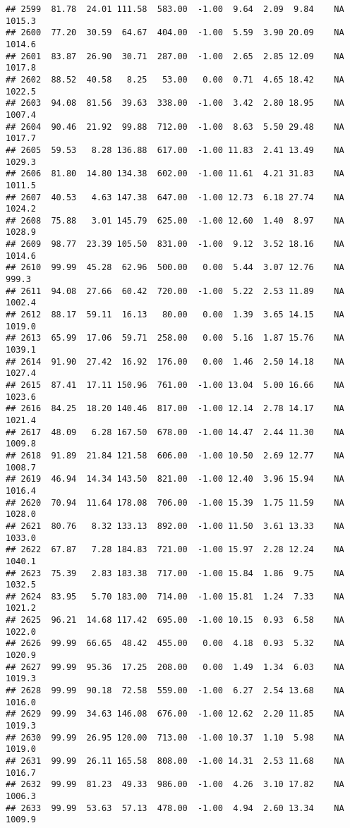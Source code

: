 \documentclass{article}\usepackage{graphicx, color}
\makeatletter
\newenvironment{kframe}{%
 \def\at@end@of@kframe{}%
 \ifinner\ifhmode%
  \def\at@end@of@kframe{\end{minipage}}%
  \begin{minipage}{\columnwidth}%
 \fi\fi%
 \def\FrameCommand##1{\hskip\@totalleftmargin \hskip-\fboxsep
 \colorbox{shadecolor}{##1}\hskip-\fboxsep
     \hskip-\linewidth \hskip-\@totalleftmargin \hskip\columnwidth}%
 \MakeFramed {\advance\hsize-\width
   \@totalleftmargin\z@ \linewidth\hsize
   \@setminipage}}%
 {\par\unskip\endMakeFramed%
 \at@end@of@kframe}
\newenvironment{knitrout}{}{} %
\makeatother
\begin{document}
\begin{knitrout}
\begin{kframe}
\begin{verbatim}
## 2599  81.78  24.01 111.58  583.00  -1.00  9.64  2.09  9.84    NA 1015.3
## 2600  77.20  30.59  64.67  404.00  -1.00  5.59  3.90 20.09    NA 1014.6
## 2601  83.87  26.90  30.71  287.00  -1.00  2.65  2.85 12.09    NA 1017.8
## 2602  88.52  40.58   8.25   53.00   0.00  0.71  4.65 18.42    NA 1022.5
## 2603  94.08  81.56  39.63  338.00  -1.00  3.42  2.80 18.95    NA 1007.4
## 2604  90.46  21.92  99.88  712.00  -1.00  8.63  5.50 29.48    NA 1017.7
## 2605  59.53   8.28 136.88  617.00  -1.00 11.83  2.41 13.49    NA 1029.3
## 2606  81.80  14.80 134.38  602.00  -1.00 11.61  4.21 31.83    NA 1011.5
## 2607  40.53   4.63 147.38  647.00  -1.00 12.73  6.18 27.74    NA 1024.2
## 2608  75.88   3.01 145.79  625.00  -1.00 12.60  1.40  8.97    NA 1028.9
## 2609  98.77  23.39 105.50  831.00  -1.00  9.12  3.52 18.16    NA 1014.6
## 2610  99.99  45.28  62.96  500.00   0.00  5.44  3.07 12.76    NA  999.3
## 2611  94.08  27.66  60.42  720.00  -1.00  5.22  2.53 11.89    NA 1002.4
## 2612  88.17  59.11  16.13   80.00   0.00  1.39  3.65 14.15    NA 1019.0
## 2613  65.99  17.06  59.71  258.00   0.00  5.16  1.87 15.76    NA 1039.1
## 2614  91.90  27.42  16.92  176.00   0.00  1.46  2.50 14.18    NA 1027.4
## 2615  87.41  17.11 150.96  761.00  -1.00 13.04  5.00 16.66    NA 1023.6
## 2616  84.25  18.20 140.46  817.00  -1.00 12.14  2.78 14.17    NA 1021.4
## 2617  48.09   6.28 167.50  678.00  -1.00 14.47  2.44 11.30    NA 1009.8
## 2618  91.89  21.84 121.58  606.00  -1.00 10.50  2.69 12.77    NA 1008.7
## 2619  46.94  14.34 143.50  821.00  -1.00 12.40  3.96 15.94    NA 1016.4
## 2620  70.94  11.64 178.08  706.00  -1.00 15.39  1.75 11.59    NA 1028.0
## 2621  80.76   8.32 133.13  892.00  -1.00 11.50  3.61 13.33    NA 1033.0
## 2622  67.87   7.28 184.83  721.00  -1.00 15.97  2.28 12.24    NA 1040.1
## 2623  75.39   2.83 183.38  717.00  -1.00 15.84  1.86  9.75    NA 1032.5
## 2624  83.95   5.70 183.00  714.00  -1.00 15.81  1.24  7.33    NA 1021.2
## 2625  96.21  14.68 117.42  695.00  -1.00 10.15  0.93  6.58    NA 1022.0
## 2626  99.99  66.65  48.42  455.00   0.00  4.18  0.93  5.32    NA 1020.9
## 2627  99.99  95.36  17.25  208.00   0.00  1.49  1.34  6.03    NA 1019.3
## 2628  99.99  90.18  72.58  559.00  -1.00  6.27  2.54 13.68    NA 1016.0
## 2629  99.99  34.63 146.08  676.00  -1.00 12.62  2.20 11.85    NA 1019.3
## 2630  99.99  26.95 120.00  713.00  -1.00 10.37  1.10  5.98    NA 1019.0
## 2631  99.99  26.11 165.58  808.00  -1.00 14.31  2.53 11.68    NA 1016.7
## 2632  99.99  81.23  49.33  986.00  -1.00  4.26  3.10 17.82    NA 1006.3
## 2633  99.99  53.63  57.13  478.00  -1.00  4.94  2.60 13.34    NA 1009.9

\end{verbatim}
\end{kframe}
\end{knitrout}
\end{document}
